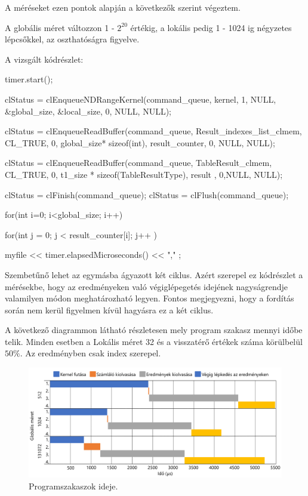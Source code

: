 A méréseket ezen pontok alapján a következők szerint végeztem.

A globális méret változzon 1 - $2^{20}$ értékig, a lokális pedig 1 - 1024 ig négyzetes lépcsőkkel, az oszthatóságra figyelve.

A vizsgált kódrészlet:
\begin{python}  
timer.start();

clStatus = clEnqueueNDRangeKernel(command_queue, kernel, 1, NULL, 
	&global_size, &local_size, 0, NULL, NULL);

clStatus =
	clEnqueueReadBuffer(command_queue, Result_indexes_list_clmem, 
	CL_TRUE, 0, global_size* sizeof(int), 
	result_counter, 0, NULL, NULL);
	
clStatus = clEnqueueReadBuffer(command_queue, TableResult_clmem, 
	CL_TRUE, 0, t1_size * sizeof(TableResultType), 
	result  , 0,NULL, NULL);

clStatus = clFinish(command_queue);
clStatus = clFlush(command_queue);

for(int i=0; i<global_size; i++)
{
	for(int j = 0; j < result_counter[i]; j++ )
	{

	}
}
myfile << timer.elapsedMicroseconds() << "," ;  
\end{python}

Szembetűnő lehet az egymásba ágyazott két ciklus. Azért szerepel ez kódrészlet a mérésekbe, hogy az eredményeken való végiglépegetés idejének nagyságrendje valamilyen módon meghatározható legyen. Fontos megjegyezni, hogy a fordítás során nem kerül figyelmen kívül hagyásra ez a két ciklus.

A következő diagrammon látható részletesen mely program szakasz mennyi időbe telik.
Minden esetben a Lokális méret 32 és a visszatérő értékek száma körülbelül $50\%$. Az eredményben csak index szerepel.

\begin{figure}[h!]
\centering
\includegraphics[width=\textwidth]{images/gantt.png}
\caption{Programszakaszok ideje.}
\label{fig:schema}
\end{figure}

